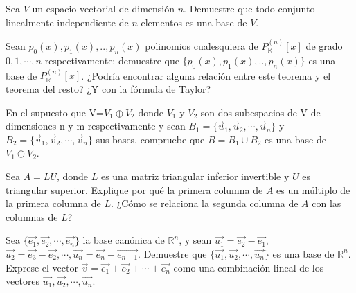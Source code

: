  
\begin{exercise}
\item

Sea $V$ un espacio vectorial de dimensión $n$. Demuestre que todo conjunto linealmente independiente de $n$ elementos es una base de $V$.
\end{exercise}

\begin{exercise}
\item

Sean $p_0(x), p_1(x),.., p_n(x)$ polinomios cualesquiera de $P^{(n)}_{\mathbb{R}}[x]$ de grado $0,1,  \cdots,n$ respectivamente: demuestre que 
$\{p_0(x), p_1(x),..,p_n(x)\}$ es una base de $P^{(n)}_{\mathbb{R}}[x]$. ¿Podría encontrar alguna relación entre este teorema y el teorema del resto?
¿Y con la fórmula de Taylor?
\end{exercise}
\begin{exercise}
\item

En el supuesto que V=$V_1\oplus V_2$ donde $V_1$ y $V_2$ son dos subespacios de V de dimensiones n y m respectivamente y sean $B_1=\{\vec{u}_1,\vec{u}_2,\cdots,\vec{u}_n\}$ y $B_2=\{\vec{v}_1,\vec{v}_2,\cdots,\vec{v}_n\}$ sus bases, compruebe que $B=B_1 \cup B_2$ es una base de $V_1\oplus V_2$.
\end{exercise}

\bigskip


\bigskip

\begin{exercise}
\item
Sea $A=LU$, donde $L$ es una matriz triangular inferior invertible y $U$ es triangular superior. Explique por qué la primera columna de $A$ es un múltiplo de la primera columna de $L$. ¿Cómo se relaciona la segunda columna de $A$ con las columnas de $L$?\\
\end{exercise}



\begin{exercise}
\item
Sea $\{\vec{e_1},\vec{e_2},\cdots,\vec{e_n}\}$ la base canónica de $\mathbb{R}^n$, y sean $\vec{u_1}=\vec{e_2}- \vec{e_1}$, $\vec{u_2}=\vec{e_3}- \vec{e_2}, \cdots,  \vec{u_n}=\vec{e_{n}}- \vec{e_{n-1}}$. 
Demuestre que  $\{\vec{u_1},\vec{u_2},\cdots,\vec{u_n}\}$ es una base de $\mathbb{R}^n$.
Exprese el vector $ \vec{v} = \vec{e_1}+ \vec{e_2}+\cdots+\vec{e_n}$  como una combinación lineal de los vectores $\vec{u_1},\vec{u_2},\cdots,\vec{u_n}$.\\


\end{exercise}



